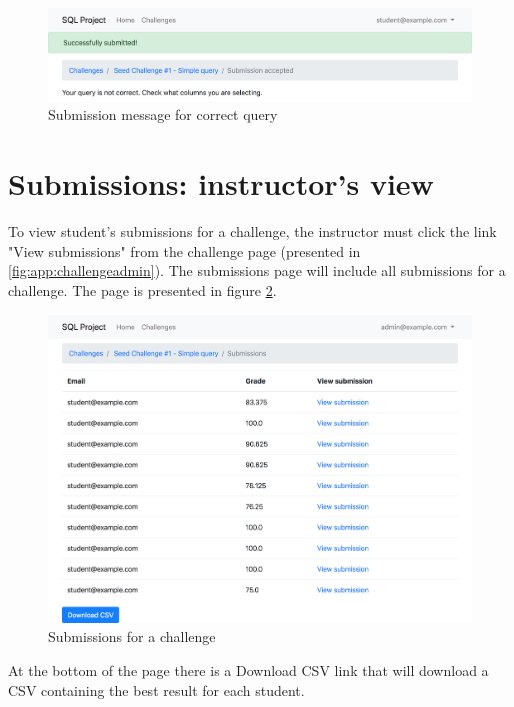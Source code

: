 \begin{figure}[H]
    \centering
    \includegraphics[width=\textwidth/4*3]{Appendices/submit_hint.png}
    \caption{Submission message for correct query}
    \label{fig:app:submit_incorrect}
\end{figure}

\section{Submissions: instructor's view}

To view student's submissions for a challenge, the instructor must click the link "View submissions" from the challenge page (presented in \ref{fig:app:challengeadmin}). The submissions page will include all submissions for a challenge. The page is presented in figure \ref{fig:app:submissions}.

\begin{figure}[ht]
    \centering
    \includegraphics[width=\textwidth/4*3]{Appendices/submissions.png}
    \caption{Submissions for a challenge}
    \label{fig:app:submissions}
\end{figure}

At the bottom of the page there is a Download CSV link that will download a CSV containing the best result for each student.

